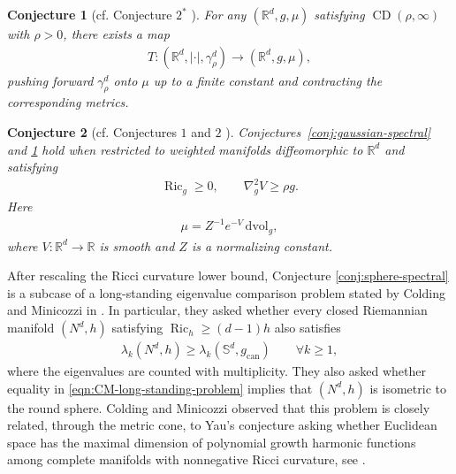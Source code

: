 \documentclass[11pt,reqno]{amsart}
\numberwithin{equation}{section}
\newtheorem{con}{Conjecture}
\theoremstyle{definition}
\theoremstyle{remark}
\def\bR {\mathbb{R}}
\newcommand{\R}{\mathbb{R}}
\newcommand{\0}{\emptyset}
\newcommand{\Ric}{\operatorname{Ric}}
\newcommand{\can}{\mathrm{can}}
\newcommand{\dvol}{\,\mathrm{dvol}}
\begin{document}
\begin{con}[cf. Conjecture $2^*$ \cite{milman2018spectral}]\label{conj:gaussian-transport}
For any $(\bR^d,g,\mu)$ satisfying $\operatorname{CD}(\rho,\infty)$ with $\rho>0$, there exists a map
\begin{align}
        T:(\bR^d,|\cdot|,\gamma_\rho^d)
        \to
        (\bR^d,g,\mu),
\end{align}
pushing forward $\gamma_\rho^d$ onto $\mu$ up to a finite constant and contracting the corresponding metrics.
\end{con}
\begin{con}[cf. Conjectures $1$ and $2$ \cite{milman2018spectral}]\label{conj:gaussian-combined}
Conjectures~\ref{conj:gaussian-spectral} and
\ref{conj:gaussian-transport} hold when restricted to weighted manifolds diffeomorphic to $\R^d$ and satisfying
\begin{align}
        \Ric_g
        \geq
        0,
        \qquad
        \nabla_g^2V
        \geq
        \rho g.
\end{align}
Here
\begin{align}
        \mu
        =
        Z^{-1}e^{-V}\dvol_g,
\end{align}
where $V:\R^d\to\R$ is smooth and $Z$ is a normalizing constant.
\end{con}
After rescaling the Ricci curvature lower bound, Conjecture
\ref{conj:sphere-spectral} is a subcase of a long-standing
eigenvalue comparison problem stated by Colding and Minicozzi in \cite[p.~261]{colding1998weyl}. In particular, they asked whether every closed Riemannian manifold $(N^d,h)$ satisfying $\operatorname{Ric}_h\geq(d-1)h$ also satisfies
\begin{align}\label{eqn:CM-long-standing-problem}
        \lambda_k(N^d,h)
        \geq
        \lambda_k(\mathbb S^d,g_{\can})
        \qquad
        \forall k\geq1,
\end{align}
where the eigenvalues are counted with multiplicity. They also asked whether equality in \eqref{eqn:CM-long-standing-problem} implies that $(N^d,h)$ is isometric to the round sphere. Colding and Minicozzi observed that this problem is closely related, through the metric cone, to Yau's conjecture asking whether Euclidean space has the maximal dimension of polynomial growth harmonic functions among complete manifolds with nonnegative Ricci curvature, see \cite[Problem 48]{yau1992open}.
\end{document}
